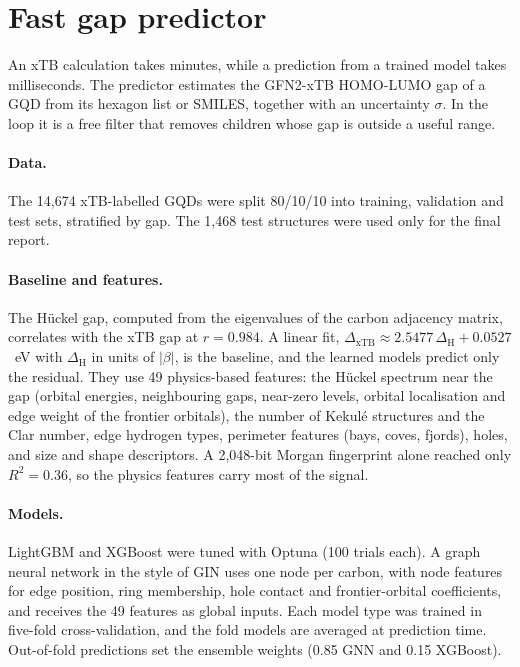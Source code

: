 \section{Fast gap predictor}
\label{sec:predictor}

An xTB calculation takes minutes, while a prediction from a trained model takes milliseconds. The
predictor estimates the GFN2-xTB HOMO-LUMO gap of a GQD from its hexagon list or SMILES, together
with an uncertainty \(\sigma\). In the loop it is a free filter that removes children whose
gap is outside a useful range.

\paragraph{Data.} The 14{,}674 xTB-labelled GQDs were split 80/10/10 into training, validation and
test sets, stratified by gap. The 1{,}468 test structures were used only for the final report.

\paragraph{Baseline and features.} The H\"uckel gap, computed from the eigenvalues of the carbon
adjacency matrix, correlates with the xTB gap at \(r = 0.984\). A linear fit,
\(\Delta_{\mathrm{xTB}} \approx 2.5477\,\Delta_{\mathrm{H}} + 0.0527\)~eV with \(\Delta_{\mathrm{H}}\)
in units of \(|\beta|\), is the baseline, and the learned models predict only the residual. They
use 49 physics-based features: the H\"uckel spectrum near the gap (orbital energies, neighbouring
gaps, near-zero levels, orbital localisation and edge weight of the frontier orbitals), the
number of Kekul\'e structures and the Clar number, edge hydrogen types, perimeter features (bays,
coves, fjords), holes, and size and shape descriptors. A 2{,}048-bit Morgan fingerprint alone
reached only \(R^2 = 0.36\), so the physics features carry most of the signal.

\paragraph{Models.} LightGBM and XGBoost \cite{ke2017lightgbm,chen2016xgboost} were tuned with
Optuna \cite{akiba2019optuna} (100 trials each). A graph neural network in the style of GIN
\cite{xu2019gin} uses one node per carbon, with node features for edge position, ring membership,
hole contact and frontier-orbital coefficients, and receives the 49 features as global inputs.
Each model type was trained in five-fold cross-validation, and the fold models are averaged at
prediction time. Out-of-fold predictions set the ensemble weights (0.85 GNN and 0.15 XGBoost).

